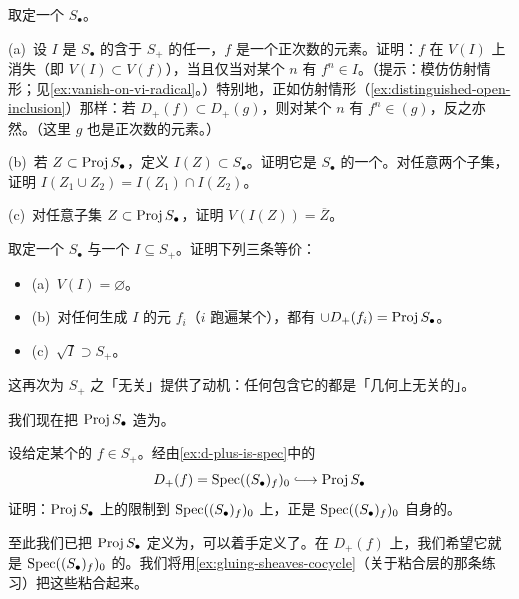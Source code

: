 \begin{exercise}\label{ex:proj-vanishing-ideals}
取定一个\trGradedRing{} $S_\bullet$。

(a)~设 $I$ 是 $S_\bullet$ 的含于 $S_+$ 的任一\trHomogeneous\trIdeal，$f$ 是一个正次数的\trHomogeneous{}元素。证明：$f$ 在 $V(I)$ 上消失（即 $V(I)\subset V(f)$），当且仅当对某个 $n$ 有 $f^n\in I$。（提示：模仿仿射情形；见\cref{ex:vanish-on-vi-radical}。）特别地，正如仿射情形（\cref{ex:distinguished-open-inclusion}）那样：若 $D_+(f)\subset D_+(g)$，则对某个 $n$ 有 $f^n\in(g)$，反之亦然。（这里 $g$ 也是正次数的\trHomogeneous{}元素。）

(b)~若 $Z\subset\operatorname{Proj} S_\bullet$，定义 $I(Z)\subset S_\bullet$。证明它是 $S_\bullet$ 的一个\trHomogeneous\trIdeal。对任意两个子集，证明 $I(Z_1\cup Z_2)=I(Z_1)\cap I(Z_2)$。

(c)~对任意子集 $Z\subset\operatorname{Proj} S_\bullet$，证明 $V(I(Z))=\overline{Z}$。
\end{exercise}

\begin{exercise}\label{ex:empty-vanishing-equivalents}
取定一个\trGradedRing{} $S_\bullet$ 与一个\trHomogeneous\trIdeal{} $I\subseteq S_+$。证明下列三条等价：
\begin{itemize}[label={},leftmargin=2.2em,itemsep=2pt,topsep=3pt]
\item (a)~$V(I)=\varnothing$。
\item (b)~对任何生成 $I$ 的\trHomogeneous{}元 $f_i$（$i$ 跑遍某个\trIndexSet），都有 $\cup D_+(f_i)=\operatorname{Proj} S_\bullet$。
\item (c)~$\sqrt{I}\supset S_+$。
\end{itemize}
这再次为 $S_+$ 之「无关」提供了动机：任何\trRadical{}包含它的\trIdeal{}都是「几何上无关的」。
\end{exercise}

我们现在把 $\operatorname{Proj} S_\bullet$ 造为\emph{\trScheme}。

\begin{exercise}\label{ex:zariski-restriction-d-plus}
设给定某个\trHomogeneous{}的 $f\in S_+$。经由\cref{ex:d-plus-is-spec}中的\trInclusionMap
\[
D_+(f)=\Spec((S_\bullet)_f)_0\lhook\joinrel\longrightarrow\Proj S_\bullet
\]
证明：$\operatorname{Proj} S_\bullet$ 上的\trZariskiTopology{}限制到 $\operatorname{Spec}((S_\bullet)_f)_0$ 上，正是 $\operatorname{Spec}((S_\bullet)_f)_0$ 自身的\trZariskiTopology。
\end{exercise}

至此我们已把 $\operatorname{Proj} S_\bullet$ 定义为\trTopologicalSpace，可以着手定义\trStructureSheaf{}了。在 $D_+(f)$ 上，我们希望它就是 $\operatorname{Spec}((S_\bullet)_f)_0$ 的\trStructureSheaf。我们将用\cref{ex:gluing-sheaves-cocycle}（关于粘合层的那条练习）把这些\trSheaf{}粘合起来。

